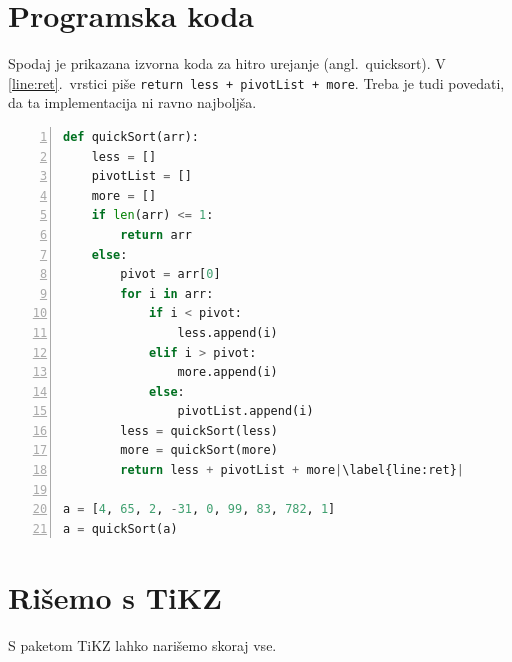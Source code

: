 \documentclass{article}
\begin{document}
\section{Programska koda}
\label{sec:programska-koda}


Spodaj je prikazana izvorna koda za hitro urejanje (angl.\ quicksort).
V \ref{line:ret}.\ vrstici piše \lstinline|return less + pivotList + more|.
Treba je tudi povedati, da ta implementacija ni ravno najboljša.

\begin{lstlisting}[language=Python,numbers=left,escapechar=|]
def quickSort(arr):
    less = []
    pivotList = []
    more = []
    if len(arr) <= 1:
        return arr
    else:
        pivot = arr[0]
        for i in arr:
            if i < pivot:
                less.append(i)
            elif i > pivot:
                more.append(i)
            else:
                pivotList.append(i)
        less = quickSort(less)
        more = quickSort(more)
        return less + pivotList + more|\label{line:ret}|
 
a = [4, 65, 2, -31, 0, 99, 83, 782, 1]
a = quickSort(a)
\end{lstlisting}

\section{Rišemo s TiKZ}
\label{sec:riemo-s-tikz}

S paketom TiKZ lahko narišemo skoraj vse.
%
\begin{center}
\end{center}
\end{document}
